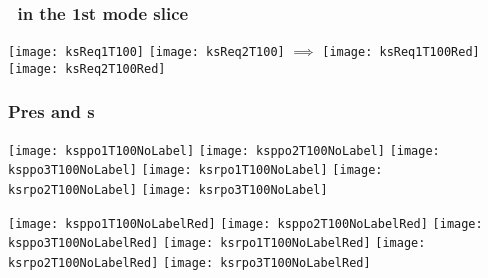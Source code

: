 \begin{frame}[shrink]%
  \frametitle{\Reqva\ in the 1st mode slice}
  \putsym
 

  \begin{center} 
    \texttt{[image: ksReq1T100]} 
    \texttt{[image: ksReq2T100]}
    $\implies$
    \texttt{[image: ksReq1T100Red]} 
    \texttt{[image: ksReq2T100Red]}
  \end{center}
  
\end{frame}

\begin{frame}%
  \frametitle{Pre\po s and \rpo s}
   
  \begin{center}
    \texttt{[image: ksppo1T100NoLabel]}
    \texttt{[image: ksppo2T100NoLabel]}
    \texttt{[image: ksppo3T100NoLabel]}
    \texttt{[image: ksrpo1T100NoLabel]}
    \texttt{[image: ksrpo2T100NoLabel]}
    \texttt{[image: ksrpo3T100NoLabel]}

    \texttt{[image: ksppo1T100NoLabelRed]}
    \texttt{[image: ksppo2T100NoLabelRed]}
    \texttt{[image: ksppo3T100NoLabelRed]}
    \texttt{[image: ksrpo1T100NoLabelRed]}
    \texttt{[image: ksrpo2T100NoLabelRed]}
    \texttt{[image: ksrpo3T100NoLabelRed]}
  \end{center}
  
\end{frame}
